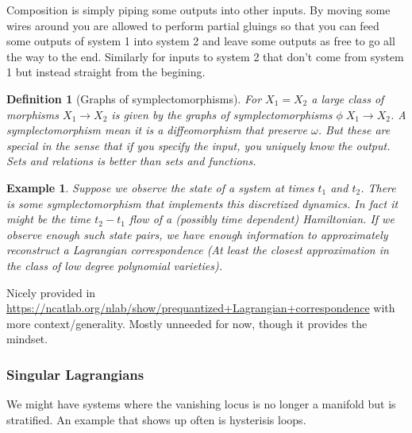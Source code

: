 \documentclass[a4paper,landscape]{article}
\theoremstyle{change}
\newtheorem{definition}[equation]{Definition}
\newtheorem{example}[equation]{Example}
\theoremstyle{nonumberplain}
\numberwithin{equation}{section}
\begin{document}
Composition is simply piping some outputs into other inputs. By moving some wires around you are allowed to perform partial gluings so that you can feed some outputs of system 1 into system 2 and leave some outputs as free to go all the way to the end. Similarly for inputs to system 2 that don't come from system 1 but instead straight from the begining.

\begin{definition}[Graphs of symplectomorphisms]
For $X_1 = X_2$ a large class of morphisms $X_1 \to X_2$ is given by the graphs of symplectomorphisms $\phi \; X_1 \to X_2$. A symplectomorphism mean it is a diffeomorphism that preserve $\omega$. But these are special in the sense that if you specify the input, you uniquely know the output. Sets and relations is better than sets and functions.
\end{definition}

\begin{example}
Suppose we observe the state of a system at times $t_1$ and $t_2$. There is some symplectomorphism that implements this discretized dynamics. In fact it might be the time $t_2 - t_1$ flow of a (possibly time dependent) Hamiltonian. If we observe enough such state pairs, we have enough information to approximately reconstruct a Lagrangian correspondence (At least the closest approximation in the class of low degree polynomial varieties).
\end{example}

Nicely provided in \url{https://ncatlab.org/nlab/show/prequantized+Lagrangian+correspondence} with more context/generality. Mostly unneeded for now, though it provides the mindset.

\subsubsection{Singular Lagrangians}

We might have systems where the vanishing locus is no longer a manifold but is stratified. An example that shows up often is hysterisis loops.
\end{document}
